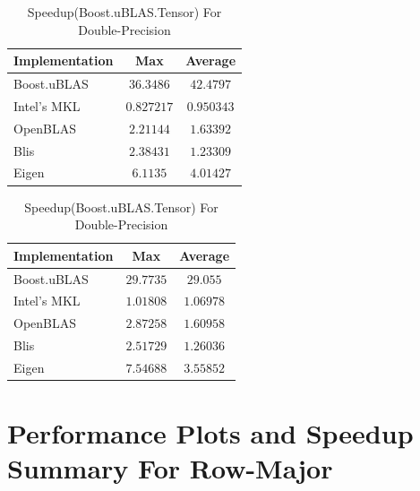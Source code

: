 \begin{table}[ht]
    \centering
    \caption{Speedup(Boost.uBLAS.Tensor) For Single-Precision}
    \begin{tabular}{|l|c|c|}
        \hline
        \textbf{Implementation} & \textbf{Max} & \textbf{Average}\\
        \hline
        Boost.uBLAS         & $36.3486$ & $42.4797$ \\
        \hline
        Intel's MKL         & $0.827217$ & $0.950343$ \\
        \hline
        OpenBLAS            & $2.21144$ & $1.63392$ \\
        \hline
        Blis                & $2.38431$ & $1.23309$ \\
        \hline
        Eigen               & $6.1135$ & $4.01427$ \\
        \hline
    \end{tabular}

    \vspace*{1 cm}

    \centering
    \caption{Speedup(Boost.uBLAS.Tensor) For Double-Precision}
    \begin{tabular}{|l|c|c|}
        \hline
        \textbf{Implementation} & \textbf{Max} & \textbf{Average}\\
        \hline
        Boost.uBLAS         & $29.7735$ & $29.055$ \\
        \hline
        Intel's MKL         & $1.01808$ & $1.06978$ \\
        \hline
        OpenBLAS            & $2.87258$ & $1.60958$ \\
        \hline
        Blis                & $2.51729$ & $1.26036$ \\
        \hline
        Eigen               & $7.54688$ & $3.55852$ \\
        \hline
    \end{tabular}
\end{table}

\clearpage
\section{Performance Plots and Speedup Summary For Row-Major}

